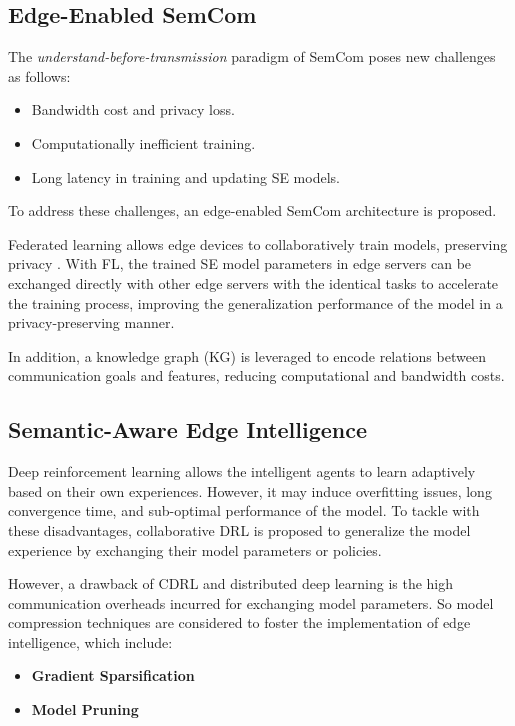 \documentclass[conference]{IEEEtran}
\begin{document}
\subsection{Edge-Enabled SemCom}
The \textit{understand-before-transmission} paradigm of SemCom poses new challenges as follows:
\begin{itemize}
    \item Bandwidth cost and privacy loss.
    \item Computationally inefficient training.
    \item Long latency in training and updating SE models.
\end{itemize}

To address these challenges, an edge-enabled SemCom architecture is proposed.

Federated learning allows edge devices to collaboratively train models, preserving privacy \cite{a6}. 
With FL, the trained SE model parameters in edge servers can be exchanged 
directly with other edge servers with the identical tasks to accelerate the 
training process, improving the generalization performance of the model in a 
privacy-preserving manner.

In addition, a knowledge graph (KG) is leveraged to encode relations between 
communication goals and features, reducing computational and bandwidth costs.

\subsection{Semantic-Aware Edge Intelligence}
Deep reinforcement learning allows the intelligent agents to learn adaptively 
based on their own experiences. However, it may induce overfitting issues, 
long convergence time, and sub-optimal performance of the model. To tackle with 
these disadvantages, collaborative DRL is proposed to generalize the model 
experience by exchanging their model parameters or policies.

However, a drawback of CDRL and distributed deep learning is the high communication overheads 
incurred for exchanging model parameters. So model compression techniques are considered 
to foster the implementation of edge intelligence, which include:
\begin{itemize}
    \item \textbf{Gradient Sparsification}
    \item \textbf{Model Pruning}
\end{itemize}
\end{document}
